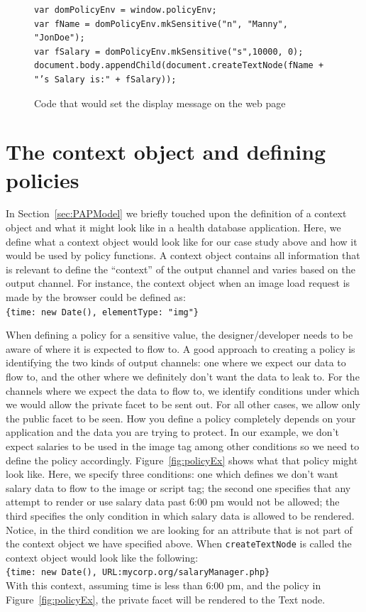 \begin{figure}
  \begin{lstlisting}
var domPolicyEnv = window.policyEnv;
var fName = domPolicyEnv.mkSensitive("n", "Manny", "JonDoe");
var fSalary = domPolicyEnv.mkSensitive("s",10000, 0);
document.body.appendChild(document.createTextNode(fName + "’s Salary is:" + fSalary));
  \end{lstlisting}
  \caption{Code that would set the display message on the web page}
  \label{fig:displaySalary}
\end{figure}

\section{The context object and defining policies \label{sec:ctxt}}
In Section~\ref{sec:PAPModel} we briefly touched upon the definition of a context
object and what it might look like in a health database application. Here, we define
what a context object would look like for our case study above and how it would
be used by policy functions. A context object contains all information that is
relevant to define the ``context'' of the output channel and varies based on the
output channel. For instance, the context object when an image load request is made
by the browser could be defined as:\\
\indent\texttt{\{time: new Date(), elementType: "img"\}}

\noindent When defining a policy for a sensitive value, the designer/developer needs
to be aware of where it is expected to flow to. A good approach to creating a policy
is identifying the two kinds of output channels: one where we expect our data to
flow to, and the other where we definitely don't want the data to leak to. For
the channels where we expect the data to flow to, we identify conditions under
which we would allow the private facet to be sent out. For all other cases, we
allow only the public facet to be seen. How you define a policy completely depends
on your application and the data you are trying to protect. In our example, we don't
expect salaries to be used in the image tag among other conditions so we need to
define the policy accordingly. Figure~\ref{fig:policyEx} shows what that policy
might look like. Here, we specify three conditions: one which defines we don't want
salary data to flow to the image or script tag; the second one specifies that any
attempt to render or use salary data past 6:00 pm would not be allowed; the third
specifies the only condition in which salary data is allowed to be rendered.
Notice, in the third condition we are looking for an attribute that is not part
of the context object we have specified above. When \texttt{createTextNode} is
called the context object would look like the following:\\
\indent\texttt{\{time: new Date(), URL:mycorp.org/salaryManager.php\}}\\
\noindent With this context, assuming time is less than 6:00 pm, and the policy
in Figure~\ref{fig:policyEx}, the private facet will be rendered to the Text node.

